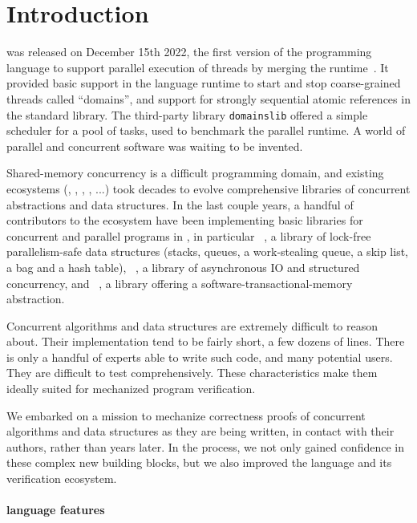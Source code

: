 \section{Introduction}
\label{sec:introduction}

 was released on December 15th 2022, the first version of the \OCaml programming language to support parallel execution of \OCaml threads by merging the \MulticoreOCaml runtime~\citep*{DBLP:journals/pacmpl/Sivaramakrishnan20}.
It provided basic support in the language runtime to start and stop coarse-grained threads called ``domains'', and support for strongly sequential atomic references in the standard library.
The third-party library \texttt{domainslib} offered a simple scheduler for a pool of tasks, used to benchmark the parallel runtime.
A world of parallel and concurrent software was waiting to be invented.

Shared-memory concurrency is a difficult programming domain, and existing ecosystems (\Cpp, \Java, \Haskell, \Rust, \Go...) took decades to evolve comprehensive libraries of concurrent abstractions and data structures.
In the last couple years, a handful of contributors to the \OCaml ecosystem have been implementing basic libraries for concurrent and parallel programs in \OCaml, in particular \Saturn~\citep*{saturn}, a library of lock-free parallelism-safe data structures (stacks, queues, a work-stealing queue, a skip list, a bag and a hash table), \Eio~\citep*{eio}, a library of asynchronous IO and structured concurrency, and \Kcas~\citep*{kcas}, a library offering a software-transactional-memory abstraction.

Concurrent algorithms and data structures are extremely difficult to reason about.
Their implementation tend to be fairly short, a few dozens of lines.
There is only a handful of experts able to write such code, and many potential users.
They are difficult to test comprehensively.
These characteristics make them ideally suited for mechanized program verification.

We embarked on a mission to mechanize correctness proofs of \OCaml concurrent algorithms and data structures as they are being written, in contact with their authors, rather than years later.
In the process, we not only gained confidence in these complex new building blocks, but we also improved the \OCaml language and its verification ecosystem.

\paragraph{\OCaml language features}

